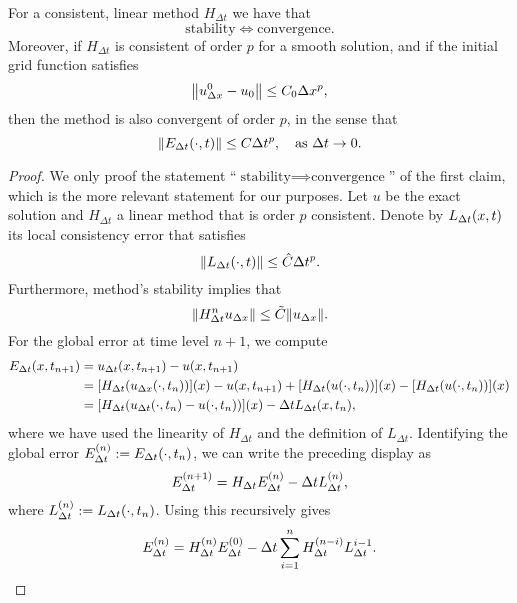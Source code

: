 \begin{theorem}
	For a consistent, linear method \(H_{\Delta t}\) we have that
	\[
		\text{stability} \iff \text{convergence}.
	\]
	Moreover, if \(H_{\Delta t}\) is consistent of order \(p\) for a smooth solution, and if the initial grid function satisfies
	\[
		\norm*{u_{\Delta x}^0 - u_0} \le C_0 \Delta x^p,
	\]
	then the method is also convergent of order \(p\), in the sense that
	\[
		\norm*{E_{\Delta t}\parentheses*{\cdot, t}} \le C\Delta t^p, \quad \text{as }\Delta t \to 0.
	\]
\end{theorem}

\begin{proof}
	We only proof the statement ``\(\text{stability} \implies \text{convergence}\)'' of the first claim, which is the more relevant statement for our purposes.
	Let \(u\) be the exact solution and \(H_{\Delta t}\) a linear method that is order \(p\) consistent.
	Denote by \(L_{\Delta t}\parentheses*{x, t}\) its local consistency error that satisfies
	\[
		\norm*{L_{\Delta t}\parentheses*{\cdot, t}} \le \hat{C}\Delta t^p.
	\]
	Furthermore, method's stability implies that
	\[
		\norm*{H_{\Delta t}^n u_{\Delta x}} \le \tilde{C}\norm*{u_{\Delta x}}.
	\]
	For the global error at time level \(n + 1\), we compute
	\begin{align*}
		E_{\Delta t}\parentheses*{x, t_{n + 1}} &= u_{\Delta t}\parentheses*{x, t_{n + 1}} - u\parentheses*{x, t_{n + 1}}\\
		&= \brackets*{H_{\Delta t}\parentheses*{u_{\Delta x}\parentheses*{\cdot, t_n}}}\parentheses*{x} - u\parentheses*{x, t_{n + 1}} + \brackets*{H_{\Delta t}\parentheses*{u\parentheses*{\cdot, t_n}}}\parentheses*{x} - \brackets*{H_{\Delta t}\parentheses*{u\parentheses*{\cdot, t_n}}}\parentheses*{x}\\
		&= \brackets*{H_{\Delta t}\parentheses*{u_{\Delta t}\parentheses*{\cdot, t_n} - u\parentheses*{\cdot, t_n}}}\parentheses*{x} - \Delta tL_{\Delta t}\parentheses*{x, t_n},
	\end{align*}
	where we have used the linearity of \(H_{\Delta t}\) and the definition of \(L_{\Delta t}\).
	Identifying the global error \(E_{\Delta t}^{\parentheses*{n}} := E_{\Delta t}\parentheses*{\cdot, t_n}\), we can write the preceding display as
	\[
		E_{\Delta t}^{\parentheses*{n + 1}} = H_{\Delta t}E_{\Delta t}^{\parentheses*{n}} - \Delta t L_{\Delta t}^{\parentheses*{n}},
	\]
	where \(L_{\Delta t}^{\parentheses*{n}} := L_{\Delta t}\parentheses*{\cdot, t_n}\).
	Using this recursively gives
	\[
		E_{\Delta t}^{\parentheses*{n}} = H_{\Delta t}^{\parentheses*{n}}E_{\Delta t}^{\parentheses*{0}} - \Delta t\sum_{i = 1}^n H_{\Delta t}^{\parentheses*{n - i}}L_{\Delta t}^{i - 1}.
\]
\end{proof}
